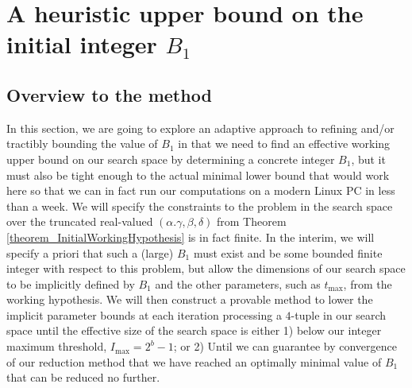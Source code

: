 \documentclass[12pt]{article}
\begin{document}
\section{A heuristic upper bound on the initial integer $B_1$} 

\subsection{Overview to the method} 

In this section, we are going to explore an adaptive 
approach to refining and/or tractibly bounding the value of $B_1$ in that 
we need to find an effective working upper bound on our search space by determining a concrete integer 
$B_1$, but it must also be tight enough to the actual minimal lower bound that would work here so that 
we can in fact run our computations on a modern Linux PC in less than a week. 
We will specify the constraints to the problem in the search space over the truncated real-valued 
$(\alpha.\gamma,\beta,\delta)$ from Theorem \ref{theorem_InitialWorkingHypothesis} 
is in fact finite. In the interim, we will specify a priori that such a (large) $B_1$ must exist and 
be some bounded finite integer with respect to this problem, but allow the dimensions of our 
search space to be implicitly defined by $B_1$ and the other parameters, such as $t_{\max}$, from the 
working hypothesis. We will then construct a provable method to lower the implicit parameter bounds at 
each iteration processing a $4$-tuple in our search space until the effective size of the search space 
is either 1) below our integer maximum threshold, $I_{\max} = 2^b-1$; or 2) Until we can guarantee by 
convergence of our reduction method that we have reached an optimally minimal value of $B_1$ that can be 
reduced no further. 
\end{document}
